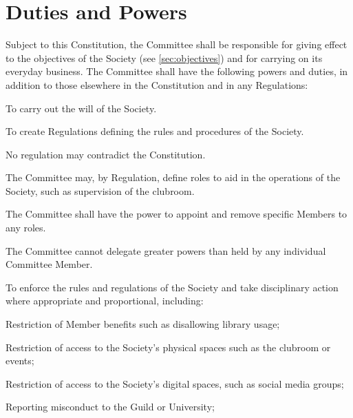 \documentclass[a4paper]{article}
\begin{document}
\section{Duties and Powers} \label{sec:duties}
\begin{myEnumerate}
    \item Subject to this Constitution, the Committee shall be responsible for giving effect to the objectives of the Society (see \cref{sec:objectives}) and for carrying on its everyday business. The Committee shall have the following powers and duties, in addition to those elsewhere in the Constitution and in any Regulations:
        \begin{myEnumerate}
            \item To carry out the will of the Society.
            \item To create Regulations defining the rules and procedures of the Society.
                \begin{myEnumerate}
                    \item No regulation may contradict the Constitution.
                \end{myEnumerate}
            \item The Committee may, by Regulation, define roles to aid in the operations of the Society, such as supervision of the clubroom.
                \begin{myEnumerate}
                    \item The Committee shall have the power to appoint and remove specific Members to any roles.
                    \item The Committee cannot delegate greater powers than held by any individual Committee Member.
                \end{myEnumerate}
            \item \label{item:disciplinary_action} To enforce the rules and regulations of the Society and take disciplinary action where appropriate and proportional, including:
                \begin{myEnumerate}
                    \item Restriction of Member benefits such as disallowing library usage;
                    \item Restriction of access to the Society’s physical spaces such as the clubroom or events;
                    \item Restriction of access to the Society’s digital spaces, such as social media groups;
                    \item Reporting misconduct to the Guild or University;

\end{myEnumerate}
\end{myEnumerate}
\end{myEnumerate}
\end{document}
